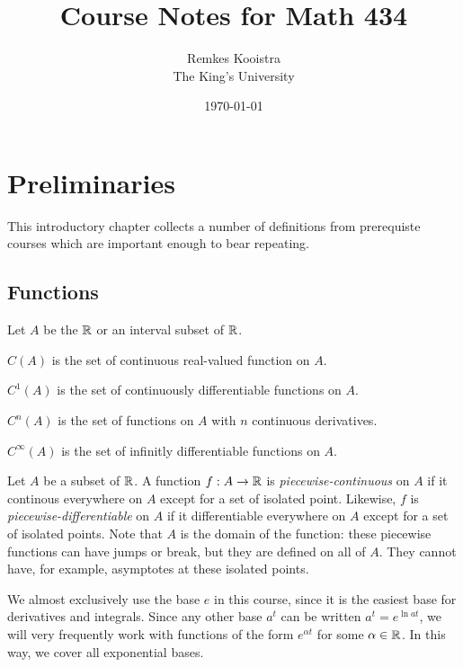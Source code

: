 \documentclass[fleqn,letterpaper]{report}
\begin{document}
\title{Course Notes for Math 434}
\author{Remkes Kooistra \\
	The King's University}
\date{\today}	

\maketitle

\setcounter{tocdepth}{1}
\tableofcontents

\chapter{Preliminaries}
\label{prelim}

This introductory chapter collects a number of definitions
from prerequiste courses which are important enough to bear
repeating.

\section{Functions}
\label{functions}

\begin{defn}
Let $A$ be the $\mathbb{R}$ or an interval subset of $\mathbb{R}$. 
\begin{smallitemize}
\item $C(A)$ is the set of continuous real-valued function on
$A$.
\item $C^1(A)$ is the set of continuously differentiable functions
on $A$. 
\item $C^n(A)$ is the set of functions on $A$ with $n$
continuous derivatives.
\item $C^\infty(A)$ is the set of infinitly differentiable
functions on $A$.
\end{smallitemize}
\end{defn}

\begin{defn}
Let $A$ be a subset of $\mathbb{R}$. A function $f:A \rightarrow \mathbb{R}$
is \emph{piecewise-continuous} on $A$ if it continous everywhere on
$A$ except for a set of isolated point. Likewise, $f$ is
\emph{piecewise-differentiable} on $A$ if it differentiable
everywhere on $A$ except for a set of isolated points. Note
that $A$ is the domain of the function: these piecewise
functions can have jumps or break, but they are defined on all
of $A$. They cannot have, for example, asymptotes at these
isolated points. 
\end{defn}

We almost exclusively use the base $e$ in this course, since it
is the easiest base for derivatives and integrals. Since any
other base $a^t$ can be written $a^t = e^{\ln a t}$, we will
very frequently work with functions of the form $e^{\alpha t}$
for some $\alpha \in \mathbb{R}$. In this way, we cover all
exponential bases.
\end{document}
